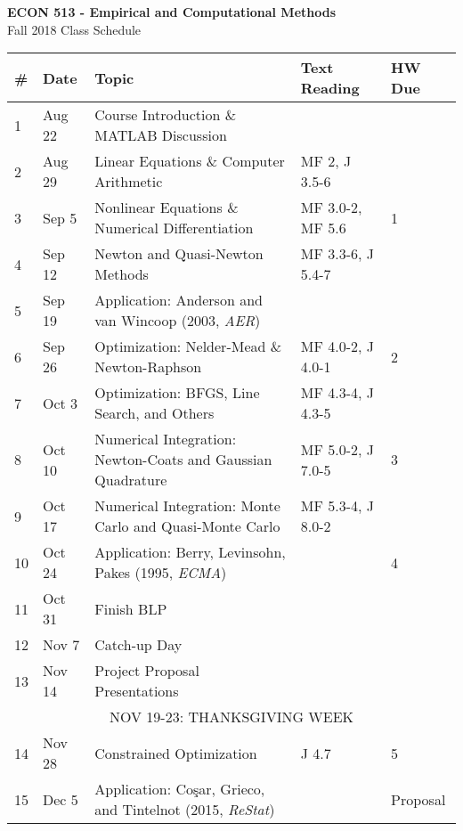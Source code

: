 \documentclass{article}
\begin{document}
\begin{center}
{\bf ECON 513 - Empirical and Computational Methods} \\
Fall 2018 Class Schedule 
\end{center}

\begin{center}
\begin{tabular}{l  l | l | l | l  }
\toprule
\# & Date & Topic & Text Reading & HW Due \\
\bottomrule
1 & Aug 22 & Course Introduction \& MATLAB Discussion &  & \\
2 & Aug 29 & Linear Equations \& Computer Arithmetic & MF 2, J 3.5-6 \\
3 & Sep 5  &  Nonlinear Equations \& Numerical Differentiation & MF 3.0-2, MF 5.6  & 1 \\ 
4 & Sep 12 & Newton and Quasi-Newton Methods & MF 3.3-6, J 5.4-7  & \\
5 & Sep 19 & Application: Anderson and van Wincoop (2003, \emph{AER})  &   \\
6 & Sep 26 & Optimization: Nelder-Mead \& Newton-Raphson & MF 4.0-2, J 4.0-1 & 2 \\
7 & Oct 3 & Optimization: BFGS, Line Search, and Others & MF 4.3-4, J 4.3-5 \\
8 & Oct 10 & Numerical Integration: Newton-Coats and Gaussian Quadrature & MF 5.0-2, J 7.0-5 & 3 \\
9 & Oct 17 & Numerical Integration: Monte Carlo and Quasi-Monte Carlo  & MF 5.3-4, J 8.0-2 &  \\
10 & Oct 24 & Application: Berry, Levinsohn, Pakes (1995, \emph{ECMA})  &  & 4 \\
11 & Oct 31 & Finish BLP & &  \\
12 & Nov 7 & Catch-up Day &   & \\
13 & Nov 14 & Project Proposal Presentations &  & \\ 
\multicolumn{5}{c}{NOV 19-23: THANKSGIVING WEEK } \\
14 & Nov 28 &  Constrained Optimization & J 4.7 & 5  \\
15 & Dec 5   & Application:  Co\c{s}ar, Grieco, and Tintelnot (2015, \emph{ReStat}) &  & Proposal \\
\bottomrule
\end{tabular}
\end{center}
\end{document}
